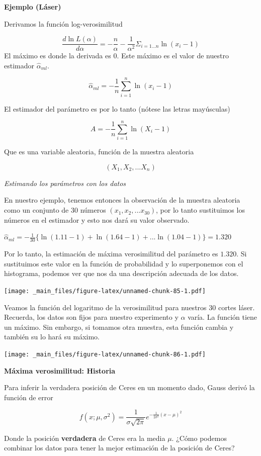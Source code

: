 \documentclass[
]{book}
\begin{document}
\textbf{Ejemplo (Láser)}

Derivamos la función log-verosimilitud

\[\frac{d \ln L(\alpha)}{d \alpha}= -\frac{n}{\alpha} - \frac{1}{\alpha^2} \Sigma_{i=1.. .n} \ln (x_i-1)\]
El máximo es donde la derivada es \(0\). Este máximo es el valor de nuestro estimador \(\hat{\alpha}_{ml}\).

\[\hat{\alpha}_{ml}=-\frac{1}{n}\sum_{i=1}^n \ln (x_i-1)\]

El estimador del parámetro es por lo tanto (nótese las letras mayúsculas)

\[A=-\frac{1}{n}\sum_{i=1}^n \ln (X_i-1)\]

Que es una variable aleatoria, función de la muestra aleatoria

\[(X_1, X_2, ... X_n)\]

\emph{Estimando los parámetros con los datos}

En nuestro ejemplo, tenemos entonces la observación de la muestra aleatoria como un conjunto de 30 números \((x_1, x_2, ...x_{30})\), por lo tanto sustituimos los números en el estimador y esto nos dará su valor observado.

\(\hat{\alpha}_{ml}=-\frac{1}{30}\{ \ln (1.11-1)+ \ln (1.64-1)+...\ln (1.04-1)\}=1.320\)

Por lo tanto, la estimación de máxima verosimilitud del parámetro es \(1.320\). Si sustituimos este valor en la función de probabilidad y lo superponemos con el histograma, podemos ver que nos da una descripción adecuada de los datos.

\texttt{[image: \_main\_files/figure-latex/unnamed-chunk-85-1.pdf]}

Veamos la función del logaritmo de la verosimilitud para nuestros \(30\) cortes láser. Recuerda, los datos son fijos para nuestro experimento y \(\alpha\) varía. La función tiene un máximo. Sin embargo, si tomamos otra muestra, esta función cambia y también su lo hará su máximo.

\texttt{[image: \_main\_files/figure-latex/unnamed-chunk-86-1.pdf]}

\textbf{Máxima verosimilitud: Historia}

Para inferir la verdadera posición de Ceres en un momento dado, Gauss derivó la función de error

\[f(x; \mu, \sigma^2)= \frac{1}{\sigma \sqrt{2 \pi}} e^{-\frac{1}{2\sigma^2} (x- \mu)^2}\]

Donde la posición \textbf{verdadera} de Ceres era la media \(\mu\). ¿Cómo podemos combinar los datos para tener la mejor estimación de la posición de Ceres?
\end{document}

